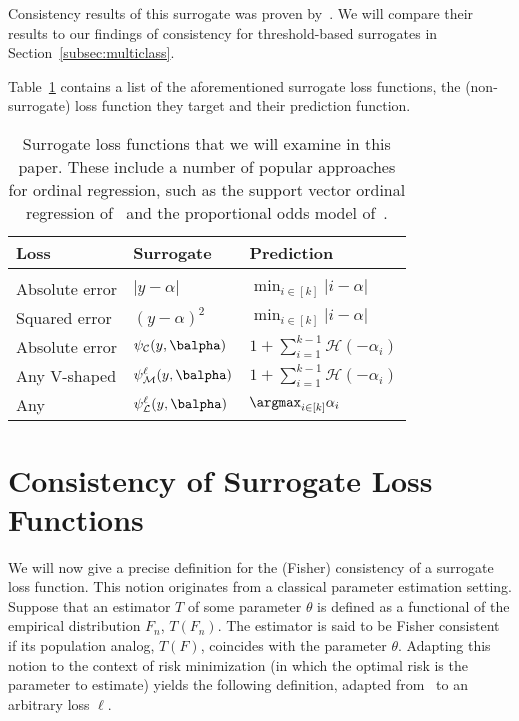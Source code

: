 Consistency results of this surrogate was proven by~\citet{Zhang}. We will compare their results to our findings of consistency for threshold-based surrogates in Section~\ref{subsec:multiclass}.

Table~\ref{sample-table} contains a list of the aforementioned surrogate loss functions, the (non-surrogate) loss function they target and their prediction function.


\begin{table}[ht]
\caption{Surrogate loss functions that we will examine in this paper. These include a number of popular approaches for ordinal regression, such as the support vector ordinal regression of~\citet{Shashua, Chu2007} and the proportional odds model of~\citet{McCullagh1980}.} \label{sample-table}
\begin{center}
\begin{tabular}{lll}
{\bf Loss}  &{\bf Surrogate}  &{\bf Prediction} \\
\hline \\
Absolute error & $| y - \alpha|$ &  $\min_{i \in [k]} |i - \alpha|$\\
Squared error & $(y - \alpha)^2$ & $\min_{i \in [k]} |i - \alpha|$\\
Absolute error & $\psi_{\mathcal{C}}(y, \balpha)$  & $1 + \sum_{i=1}^{k-1} \mathcal{H}(-\alpha_i)$\\
Any V-shaped &$\psi^{\ell}_{\mathcal{M}}(y, \balpha)$ & $1 + \sum_{i=1}^{k-1} \mathcal{H}(-\alpha_i)$ \\
Any &$\psi^{\ell}_{\mathcal{L}}(y, \balpha)$ & $\argmax_{i \in [k]} \alpha_i$ \\
\end{tabular}
\end{center}
\end{table}








\section{Consistency of Surrogate Loss Functions}\label{sct:consistency}

We will now give a precise definition for the (Fisher) consistency of a surrogate loss function. This notion originates from a classical parameter estimation setting. Suppose that an estimator $T$ of some parameter $\theta$ is defined
as a functional of the empirical distribution $F_n$, $T(F_n)$. The estimator is said to be Fisher consistent if its population analog, $T(F)$, coincides with the parameter $\theta$. Adapting this notion to the context of risk minimization (in which the optimal risk is the parameter to estimate) yields the following definition, adapted from~\citep{Lin2004} to an arbitrary loss $\ell$.

